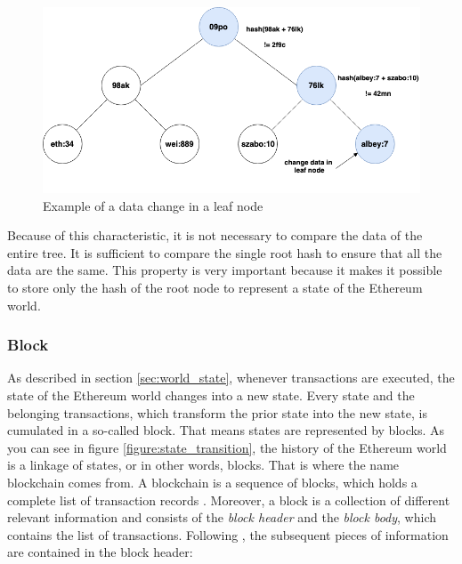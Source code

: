 \begin{figure}[htbp]
	\centering
	\includegraphics[width=.75\linewidth]{./figures/merkle_tree_change.png}
	\caption{Example of a data change in a leaf node}
	\label{figure:merkle_tree_change}
\end{figure}

Because of this characteristic, it is not necessary to compare the data of the entire tree. 
It is sufficient to compare the single root hash to ensure that all the data are the same. 
This property is very important because it makes it possible to store only the hash of 
the root node to represent a state of the Ethereum world. 

\subsubsection{Block} 
\label{sec:block}
As described in section \ref{sec:world_state}, whenever transactions are executed, 
the state of the Ethereum world changes into a new state. 
Every state and the belonging transactions, which transform the prior state into 
the new state, is cumulated in a so-called block. That means states are represented 
by blocks. As you can see in figure \ref{figure:state_transition}, the history of 
the Ethereum world is a linkage of states, or in other words, blocks. 
That is where the name blockchain comes from. A blockchain is a sequence 
of blocks, which holds a complete list of transaction records . 
Moreover, a block is a collection of different relevant information and 
consists of the \textit{block header} and the \textit{block body}, 
which contains the list of transactions. Following , 
the subsequent pieces of information are contained in the block header:

